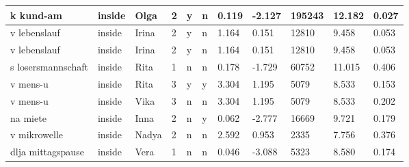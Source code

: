 \begin{longtable}{|p{4cm}|p{1cm}|p{1.2cm}|p{0.5cm}|p{0.5cm}|p{0.5cm}|R{1cm}|R{1cm}|R{1cm}|R{1cm}|R{1cm}|}
k kund-am                  & inside            & Olga          & 2                                   & y                          & n                          & 0.119      & -2.127        & 195243                  & 12.182                        & 0.027                   \\ \hline
v lebenslauf               & inside            & Irina         & 2                                   & y                          & n                          & 1.164      & 0.151         & 12810                   & 9.458                         & 0.053                   \\ \hline
v lebenslauf               & inside            & Irina         & 2                                   & y                          & n                          & 1.164      & 0.151         & 12810                   & 9.458                         & 0.053                   \\ \hline
s losersmannschaft         & inside            & Rita          & 1                                   & n                          & n                          & 0.178      & -1.729        & 60752                   & 11.015                        & 0.406                   \\ \hline
v mens-u                   & inside            & Rita          & 3                                   & y                          & y                          & 3.304      & 1.195         & 5079                    & 8.533                         & 0.153                   \\ \hline
v mens-u                   & inside            & Vika          & 3                                   & n                          & n                          & 3.304      & 1.195         & 5079                    & 8.533                         & 0.202                   \\ \hline
na miete                   & inside            & Inna          & 2                                   & n                          & y                          & 0.062      & -2.777        & 16669                   & 9.721                         & 0.179                   \\ \hline
v mikrowelle               & inside            & Nadya         & 2                                   & n                          & n                          & 2.592      & 0.953         & 2335                    & 7.756                         & 0.376                   \\ \hline
dlja mittagspause          & inside            & Vera          & 1                                   & n                          & n                          & 0.046      & -3.088        & 5323                    & 8.580                         & 0.174                   \\ \hline

\end{longtable}
